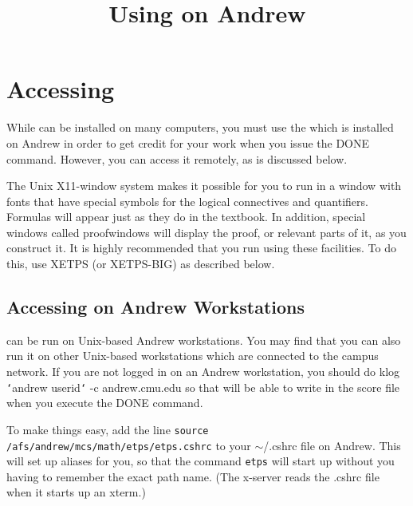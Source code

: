 \documentclass{article}
\begin{document}
\title{Using {\ETPS} on Andrew}
\date{}				%
\maketitle


\section{Accessing {\ETPS}}

While {\ETPS} can be installed on many computers, you must use the
{\ETPS} which is installed on Andrew in order to get credit for your work
when you issue the DONE command. However, you can access it remotely,
as is discussed below.

The Unix X11-window system makes it possible for you to run {\ETPS} in a
window with fonts that have special symbols for the logical
connectives and quantifiers. Formulas will appear just as they do in
the textbook. In addition, special windows called proofwindows
will display the proof, or relevant parts of it, as you construct it.
It is highly recommended that you run {\ETPS} using these facilities.
To do this, use XETPS (or XETPS-BIG) as described below.

\subsection{Accessing {\ETPS} on Andrew Workstations}

{\ETPS} can be run on Unix-based Andrew workstations.
You may  find that you can also run it on other Unix-based
workstations which are connected to the campus network.
If you are not logged in on an Andrew workstation, you should do\newline{}
klog {\tt\char`\<}andrew userid{\tt\char`\>} -c andrew.cmu.edu\newline{}
so that {\ETPS} will be able to write in the score file when you
execute the DONE command.

To make things easy, add the line\newline{}
{\tt source /afs/andrew/mcs/math/etps/etps.cshrc}\newline{}
to your $\sim$/.cshrc file on Andrew.
This will set up aliases for you, so that the command\newline{}
{\tt etps}\newline{}
will start up {\ETPS} without you having to remember the exact path name.
(The x-server reads the .cshrc file when it starts up an xterm.)
\end{document}
